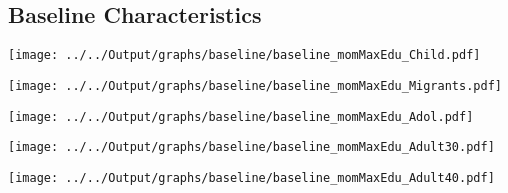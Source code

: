 \documentclass{beamer}
\begin{document}
%
%
%

\subsection{Baseline Characteristics}\label{sec:baseline}

\begin{frame}
\texttt{[image: ../../Output/graphs/baseline/baseline\_momMaxEdu\_Child.pdf]}
\end{frame}

\begin{frame}
\texttt{[image: ../../Output/graphs/baseline/baseline\_momMaxEdu\_Migrants.pdf]}
\end{frame}

\begin{frame}
\texttt{[image: ../../Output/graphs/baseline/baseline\_momMaxEdu\_Adol.pdf]}
\end{frame}

\begin{frame}
\texttt{[image: ../../Output/graphs/baseline/baseline\_momMaxEdu\_Adult30.pdf]}
\end{frame}

\begin{frame}
\texttt{[image: ../../Output/graphs/baseline/baseline\_momMaxEdu\_Adult40.pdf]}
\end{frame}
\end{document}
